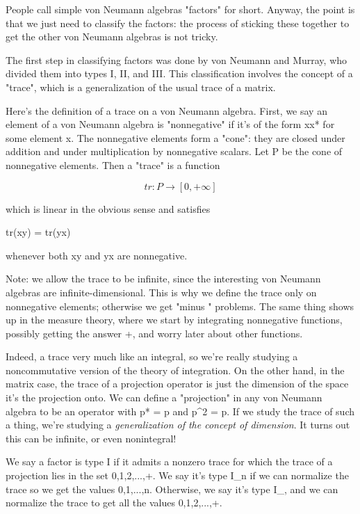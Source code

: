 People call simple von Neumann algebras "factors" for short.  Anyway, 
the point is that we just need to classify the factors: the process 
of sticking these together to get the other von Neumann algebras is
not tricky.


The first step in classifying factors was done by von Neumann and
Murray, who divided them into types I, II, and III.  This classification
involves the concept of a "trace", which is a generalization
of the usual trace of a matrix.

Here's the definition of a trace on a von Neumann algebra.  First, we
say an element of a von Neumann algebra is "nonnegative" if
it's of the form xx* for some element x.  The nonnegative elements form
a "cone": they are closed under addition and under
multiplication by nonnegative scalars.  Let P be the cone of nonnegative
elements.  Then a "trace" is a function


$$

tr: P \to  [0, +\infty ]
$$
    
which is linear in the obvious sense and satisfies

tr(xy) = tr(yx)

whenever both xy and yx are nonnegative.

Note: we allow the trace to be infinite, since the interesting von
Neumann algebras are infinite-dimensional.   This is why we define 
the trace only on nonnegative elements; otherwise we get "\infty  minus
\infty " problems.  The same thing shows up in the measure theory,
where we start by integrating nonnegative functions, possibly getting
the answer +\infty , and worry later about other functions.

Indeed, a trace very much like an integral, so we're really studying a
noncommutative version of the theory of integration.  On the other hand,
in the matrix case, the trace of a projection operator is just the
dimension of the space it's the projection onto.  We can define a
"projection" in any von Neumann algebra to be an operator with
p* = p and p^{2} = p.  If we study the trace of such a thing,
we're studying a \emph{generalization of the concept of dimension}.  
It turns out this can be infinite, or even nonintegral!

We say a factor is type I if it admits a nonzero trace for
which the trace of a projection lies in the set {0,1,2,...,+\infty }.
We say it's type I_{n} if we can normalize the trace
so we get the values {0,1,...,n}.  Otherwise, we say it's type
I_{\infty }, and we can normalize the trace to get all the 
values {0,1,2,...,+\infty }.

